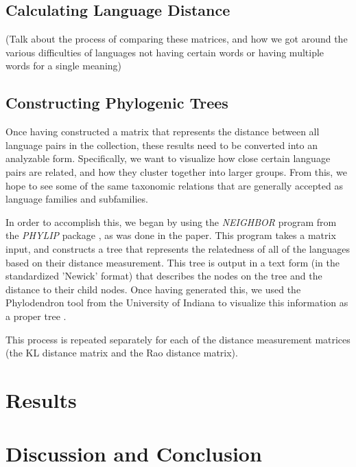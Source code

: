 \documentclass[10pt,a4]{article}
\begin{document}
\subsection{Calculating Language Distance}

(Talk about the process of comparing these matrices, and how we got around the various difficulties of languages not having certain words or having multiple words for a single meaning)

\subsection{Constructing Phylogenic Trees}

Once having constructed a matrix that represents the distance between all language pairs in the collection, these results need to be converted into an analyzable form.  Specifically, we want to visualize how close certain language pairs are related, and how they cluster together into larger groups.  From this, we hope to see some of the same taxonomic relations that are generally accepted as language families and subfamilies.

In order to accomplish this, we began by using the \textit{NEIGHBOR} program from the \textit{PHYLIP} package \cite{web:phylip}, as was done in the paper.  This program takes a matrix input, and constructs a tree that represents the relatedness of all of the languages based on their distance measurement.  This tree is output in a text form (in the standardized 'Newick' format) that describes the nodes on the tree and the distance to their child nodes.  Once having generated this, we used the Phylodendron tool from the University of Indiana to visualize this information as a proper tree \cite{web:phylodendron}.  

This process is repeated separately for each of the distance measurement matrices (the KL distance matrix and the Rao distance matrix).

\section{Results}

\section{Discussion and Conclusion}




\setlength{\bibleftmargin}{.125in}
\setlength{\bibindent}{-\bibleftmargin}


\end{document}

